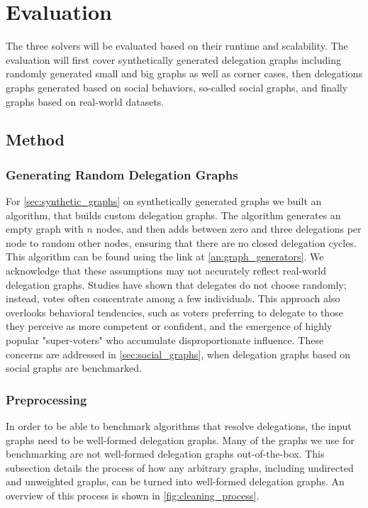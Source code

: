 \graphicspath{ {./figures/} }

\chapter{Evaluation}
\label{chap:evaluation}

The three solvers will be evaluated based on their runtime and scalability. The evaluation will first cover synthetically generated delegation graphs including randomly generated small and big graphs as well as corner cases, then delegations graphs generated based on social behaviors, so-called social graphs, and finally graphs based on real-world datasets.

\section{Method}

\subsection{Generating Random Delegation Graphs}

For \cref{sec:synthetic_graphs} on synthetically generated graphs we built an algorithm, that builds custom delegation graphs. The algorithm generates an empty graph with $n$ nodes, and then adds between zero and three delegations per node to random other nodes, ensuring that there are no closed delegation cycles. This algorithm can be found using the link at \cref{an:graph_generators}. We acknowledge that these assumptions may not accurately reflect real-world delegation graphs. Studies have shown that delegates do not choose randomly; instead, votes often concentrate among a few individuals. This approach also overlooks behavioral tendencies, such as voters preferring to delegate to those they perceive as more competent or confident, and the emergence of highly popular "super-voters" who accumulate disproportionate influence. These concerns are addressed in \cref{sec:social_graphs}, when delegation graphs based on social graphs are benchmarked. 

\subsection{Preprocessing}

In order to be able to benchmark algorithms that resolve delegations, the input graphs need to be well-formed delegation graphs. Many of the graphs we use for benchmarking are not well-formed delegation graphs out-of-the-box. This subsection details the process of how any arbitrary graphs, including undirected and unweighted graphs, can be turned into well-formed delegation graphs. An overview of this process is shown in \cref{fig:cleaning_process}.

